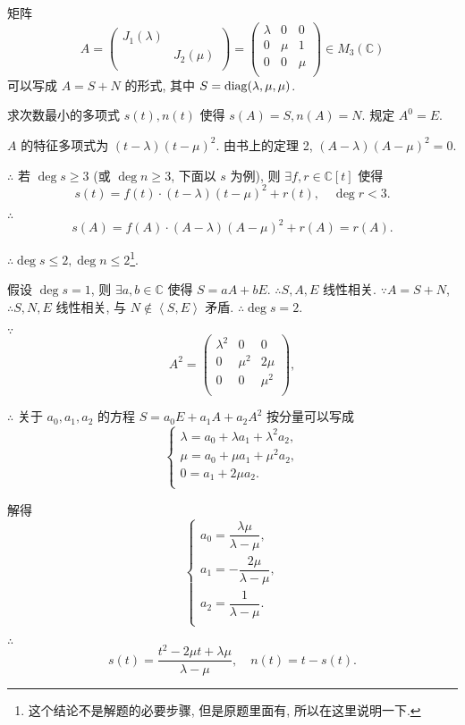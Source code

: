 \documentclass[color=black,device=normal,lang=cn,mode=geye]{elegantnote}
\begin{document}
\addtocounter{exercise}{2}
\begin{exercise}%
    矩阵
    \[A=\begin{pmatrix}
        J_1(\lambda) \\
        & J_2(\mu) \\
    \end{pmatrix}=\begin{pmatrix}
        \lambda & 0 & 0 \\
        0 & \mu & 1 \\
        0 & 0 & \mu \\
    \end{pmatrix}\in M_3(\mathbb{C})\]
    可以写成 $A=S+N$ 的形式, 其中 $S=\operatorname{diag} (\lambda,\mu,\mu)$.

    求次数最小的多项式 $s(t),n(t)$ 使得 $s(A)=S,n(A)=N$. 规定 $A^0=E$.
\end{exercise}
\begin{solution}
    $A$ 的特征多项式为 $(t-\lambda)(t-\mu)^2$. 由书上的定理 2, $(A-\lambda)(A-\mu)^2=0$.

    $\therefore$ 若 $\deg s\geq3$ (或 $\deg n\geq3$, 下面以 $s$ 为例), 则 $\exists f,r\in\mathbb{C}[t]$ 使得
    \[s(t)=f(t)\cdot(t-\lambda)(t-\mu)^2+r(t),\quad\deg r<3.\]

    $\therefore$
    \[s(A)=f(A)\cdot(A-\lambda)(A-\mu)^2+r(A)=r(A).\]

    $\therefore\deg s\leq 2,\deg n\leq 2$\footnote{这个结论不是解题的必要步骤, 但是原题里面有, 所以在这里说明一下.}.

    假设 $\deg s=1$, 则 $\exists a,b\in\mathbb{C}$ 使得 $S=aA+bE$. $\therefore S,A,E$ 线性相关. $\because A=S+N$, $\therefore S,N,E$ 线性相关, 与 $N\notin\left<S,E\right>$ 矛盾. $\therefore\deg s=2$.

    $\because$
    \[A^2=\begin{pmatrix}
        \lambda^2 & 0 & 0 \\
        0 & \mu^2 & 2\mu \\
        0 & 0 & \mu^2 \\
    \end{pmatrix},\]

    $\therefore$ 关于 $a_0,a_1,a_2$ 的方程 $S=a_0E+a_1A+a_2A^2$ 按分量可以写成
    \[\begin{cases}
        \lambda=a_0+\lambda a_1+\lambda^2a_2, \\
        \mu=a_0+\mu a_1+\mu^2a_2, \\
        0=a_1+2\mu a_2. \\
    \end{cases}\]

    解得
    \[\begin{cases}
        a_0=\dfrac{\lambda\mu}{\lambda-\mu}, \\[8pt]
        a_1=-\dfrac{2\mu}{\lambda-\mu}, \\[8pt]
        a_2=\dfrac{1}{\lambda-\mu}. \\
    \end{cases}\]

    $\therefore$
    \[s(t)=\dfrac{t^2-2\mu t+\lambda\mu}{\lambda-\mu},\quad n(t)=t-s(t).\]
\end{solution}
\end{document}
